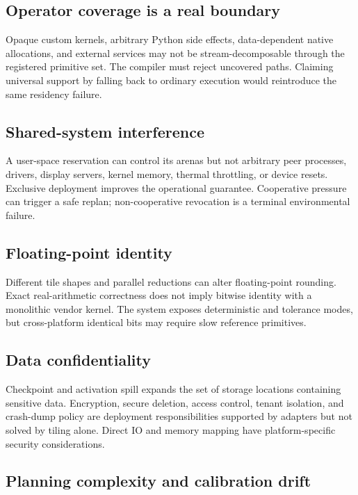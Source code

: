 \subsection{Operator coverage is a real boundary}

Opaque custom kernels, arbitrary Python side effects, data-dependent native allocations, and external services may not be stream-decomposable through the registered primitive set. The compiler must reject uncovered paths. Claiming universal support by falling back to ordinary execution would reintroduce the same residency failure.

\subsection{Shared-system interference}

A user-space reservation can control its arenas but not arbitrary peer processes, drivers, display servers, kernel memory, thermal throttling, or device resets. Exclusive deployment improves the operational guarantee. Cooperative pressure can trigger a safe replan; non-cooperative revocation is a terminal environmental failure.

\subsection{Floating-point identity}

Different tile shapes and parallel reductions can alter floating-point rounding. Exact real-arithmetic correctness does not imply bitwise identity with a monolithic vendor kernel. The system exposes deterministic and tolerance modes, but cross-platform identical bits may require slow reference primitives.

\subsection{Data confidentiality}

Checkpoint and activation spill expands the set of storage locations containing sensitive data. Encryption, secure deletion, access control, tenant isolation, and crash-dump policy are deployment responsibilities supported by adapters but not solved by tiling alone. Direct IO and memory mapping have platform-specific security considerations.

\subsection{Planning complexity and calibration drift}

